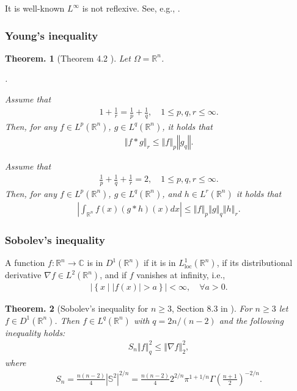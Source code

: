 \documentclass[openany, a4paper, oneside]{jsbook}
\newcounter{enum2}
\renewenvironment{enumerate}{%
\begin{list}%
{%
\arabic{enum2}.\ \,%
}%
{%
\usecounter{enum2}
\setlength{\itemindent}{0pt}%
\setlength{\leftmargin}{15pt}%
\setlength{\rightmargin}{0pt}%
\setlength{\labelsep}{0pt}%
\setlength{\labelwidth}{6pt}%
\setlength{\itemsep}{0pt}%
\setlength{\parsep}{0pt}%
\setlength{\listparindent}{0pt}%
}
}{%
\end{list}%
}
\theoremstyle{break}
\newtheorem{thm}{Theorem.}[section]
\theoremstyle{breakdefn}
\newcommand{\abs}[1]{\left|#1\right|}
\newcommand{\norm}[1]{\left\Vert#1\right\Vert}
\newcommand{\twonorm}[1]{\norm{#1}_2}
\newcommand{\rbk}[1]{\left (#1\right)}
\newcommand{\relmiddle}[1]{\mathrel{}\middle#1\mathrel{}}
\newcommand{\set}[2]{\left\{#1 \relmiddle| #2\right\}}
\newcommand{\bbC}{\mathbb{C}}
\newcommand{\bbR}{\mathbb{R}}
\newcommand{\bbRn}{\mathbb{R}^n}
\newcommand{\bbS}{\mathbb{S}}
\newcommand{\Loneloc}{L_{\mathrm{loc}}^1}
\newcommand{\LtwoRn}{L^2 \rbk{\bbR^n}}
\begin{document}
It is well-known $L^{\infty}$ is not reflexive.
See, e.g., \cite{HaimBrezis1, HaimBrezis2}.
\subsubsection{Young's inequality}


\begin{thm}[Theorem 4.2 \cite{LiebLoss1}]\label{Lieb-Loss_Analysis_chap11_37}
 Let $\Omega = \bbRn$.
\begin{enumerate}
\item Assume that
    \begin{align}
     1 + \frac{1}{r} = \frac{1}{p} + \frac{1}{q}, \quad 1 \leq p, q, r \leq \infty.
    \end{align}
    Then, for any $f \in L^p (\bbRn)$, $g \in L^q (\bbRn)$, it holds that
    \begin{align}
     \norm{f * g}_r
     \leq
     \norm{f}_p \norm{g_q}.
    \end{align}
\item Assume that
    \begin{align}
      \frac{1}{p} + \frac{1}{q} + \frac{1}{r} = 2, \quad 1 \leq p, q, r \leq \infty.
    \end{align}
    Then, for any $f \in L^p (\bbRn)$, $g \in L^q (\bbRn)$, and $h \in L^r \rbk{\bbRn}$ it holds that
    \begin{align}
     \abs{\int_{\bbRn} f (x) \rbk{g * h} (x) dx}
     \leq
     \norm{f}_p \norm{g}_q \norm{h}_r.
    \end{align}
\end{enumerate}
\end{thm}
\subsubsection{Sobolev's inequality}


A function $f \colon \bbRn \to \bbC$ is in $D^1 (\bbRn)$ if it is in $\Loneloc (\bbRn)$, if its distributional derivative $\nabla f \in \LtwoRn$,
and if $f$ vanishes at infinity, i.e.,
\begin{align}
 \abs{\set{x}{\abs{f (x)} > a}} < \infty, \quad \forall a > 0.
\end{align}
\begin{thm}[Sobolev's inequality for $n \geq 3$, Section 8.3 in \cite{LiebLoss1}]\label{Lieb-Loss_Analysis_chap11_4}
 For $n \geq 3$ let $f \in D^1 (\bbRn)$.
 Then $f \in L^q (\bbRn)$ with $q = 2n/ (n-2)$ and the following inequality holds:
\begin{align}
 S_n \norm{f}_{q}^2
 \leq
 \twonorm{\nabla f}^2,
\end{align}
where
\begin{align}
 S_n
 =
 \frac{n (n-2)}{4} \abs{\bbS^2}^{2/n}
 =
 \frac{n (n-2)}{4} 2^{2/n} \pi^{1 + 1/n} \Gamma \rbk{\frac{n+1}{2}}^{-2/n}.
\end{align}
\end{thm}
\end{document}
